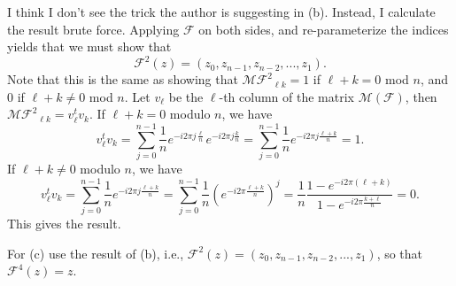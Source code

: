 I think I don't see the trick the author is suggesting in (b).
Instead, I calculate the result brute force.
Applying $\mathcal{F}$ on both sides, and re-parameterize the indices yields that we must show that
\begin{equation*}
    \mathcal{F}^2(z) = (z_0, z_{n-1}, z_{n-2}, ..., z_1).
\end{equation*}
Note that this is the same as showing that $\mathcal{M}{\mathcal{F}^2}_{\ell k} = 1$ if $\ell + k = 0$ mod $n$, and $0$ if $\ell + k \neq 0$ mod $n$.
Let $v_{\ell}$ be the $\ell$-th column of the matrix $\mathcal{M}(\mathcal{F})$, then $\mathcal{M}{\mathcal{F}^2}_{\ell k} = v_{\ell}^t v_k$.
If $\ell + k = 0$ modulo $n$, we have
\begin{equation*}
    v_{\ell}^t v_k = \sum_{j = 0}^{n - 1} \frac{1}{n} e^{-i 2 \pi j \frac{\ell}{n}} e^{-i 2 \pi j \frac{k}{n}}
        = \sum_{j = 0}^{n - 1} \frac{1}{n} e^{-i 2 \pi j \frac{\ell + k}{n}}
        = 1.
\end{equation*}
If $\ell + k \neq 0$ modulo $n$, we have
\begin{equation*}
    v_{\ell}^t v_k
        = \sum_{j = 0}^{n - 1} \frac{1}{n} e^{-i 2 \pi j \frac{\ell + k}{n}}
        = \sum_{j = 0}^{n - 1} \frac{1}{n} \left( e^{-i 2 \pi \frac{\ell + k}{n}} \right)^j
        = \frac{1}{n} \frac{1 - e^{-i 2 \pi (\ell + k)}}{1 - e^{-i 2 \pi \frac{k + \ell}{n}}}
        = 0.
\end{equation*}
This gives the result.

For (c) use the result of (b), i.e., $\mathcal{F}^2(z) = (z_0, z_{n-1}, z_{n-2}, ..., z_1)$, so that $\mathcal{F}^4(z) = z$.
